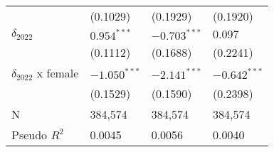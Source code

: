 \begin{tabular}{llll}
                           &           (0.1029) &           (0.1929) &           (0.1920) \\
$\delta_{2022}$            &      $0.954^{***}$ &     $-0.703^{***}$ &            $0.097$ \\
                           &           (0.1112) &           (0.1688) &           (0.2241) \\
$\delta_{2022}$ x female   &     $-1.050^{***}$ &     $-2.141^{***}$ &     $-0.642^{***}$ \\
                           &           (0.1529) &           (0.1590) &           (0.2398) \\
N                          &            384,574 &            384,574 &            384,574 \\
Pseudo $R^2$               &             0.0045 &             0.0056 &             0.0040 \\
\bottomrule
\end{tabular}
